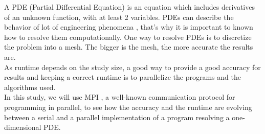 \documentclass{article}
\begin{document}
        A PDE (Partial Differential Equation) is an equation which includes derivatives of an unknown function, with at least 2 variables.
        PDEs can describe the behavior of lot of engineering phenomena \cite{pde}, that's why it is important to 
        known how to resolve them computationally. One way to resolve PDEs is to discretize the problem into
        a mesh. The bigger is the mesh, the more accurate the results are.\\
        As runtime depends on the study size, a good way to provide a good accuracy for results
        and keeping a correct runtime is to parallelize the programs and the algorithms used.\\
        In this study, we will use MPI \cite{mpi_doc}, a well-known communication protocol for programming in parallel, to
        see how the accuracy and the runtime are evolving between a serial and a parallel implementation
        of a program resolving a one-dimensional PDE.
        
    
    
        \newpage
\end{document}
